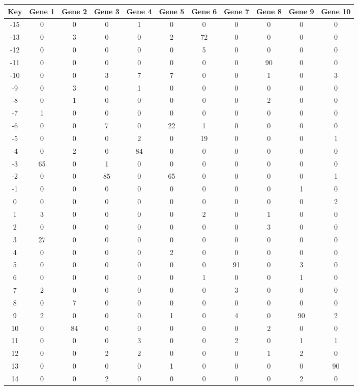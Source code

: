 \begin{tabular}{|c|c|c|c|c|c|c|c|c|c|c|}
\hline
Key & Gene 1 & Gene 2 & Gene 3 & Gene 4 & Gene 5 & Gene 6 & Gene 7 & Gene 8 & Gene 9 & Gene 10 \\
\hline
-15 & 0 & 0 & 0 & 1 & 0 & 0 & 0 & 0 & 0 & 0 \\
-13 & 0 & 3 & 0 & 0 & 2 & 72 & 0 & 0 & 0 & 0 \\
-12 & 0 & 0 & 0 & 0 & 0 & 5 & 0 & 0 & 0 & 0 \\
-11 & 0 & 0 & 0 & 0 & 0 & 0 & 0 & 90 & 0 & 0 \\
-10 & 0 & 0 & 3 & 7 & 7 & 0 & 0 & 1 & 0 & 3 \\
-9 & 0 & 3 & 0 & 1 & 0 & 0 & 0 & 0 & 0 & 0 \\
-8 & 0 & 1 & 0 & 0 & 0 & 0 & 0 & 2 & 0 & 0 \\
-7 & 1 & 0 & 0 & 0 & 0 & 0 & 0 & 0 & 0 & 0 \\
-6 & 0 & 0 & 7 & 0 & 22 & 1 & 0 & 0 & 0 & 0 \\
-5 & 0 & 0 & 0 & 2 & 0 & 19 & 0 & 0 & 0 & 1 \\
-4 & 0 & 2 & 0 & 84 & 0 & 0 & 0 & 0 & 0 & 0 \\
-3 & 65 & 0 & 1 & 0 & 0 & 0 & 0 & 0 & 0 & 0 \\
-2 & 0 & 0 & 85 & 0 & 65 & 0 & 0 & 0 & 0 & 1 \\
-1 & 0 & 0 & 0 & 0 & 0 & 0 & 0 & 0 & 1 & 0 \\
0 & 0 & 0 & 0 & 0 & 0 & 0 & 0 & 0 & 0 & 2 \\
1 & 3 & 0 & 0 & 0 & 0 & 2 & 0 & 1 & 0 & 0 \\
2 & 0 & 0 & 0 & 0 & 0 & 0 & 0 & 3 & 0 & 0 \\
3 & 27 & 0 & 0 & 0 & 0 & 0 & 0 & 0 & 0 & 0 \\
4 & 0 & 0 & 0 & 0 & 2 & 0 & 0 & 0 & 0 & 0 \\
5 & 0 & 0 & 0 & 0 & 0 & 0 & 91 & 0 & 3 & 0 \\
6 & 0 & 0 & 0 & 0 & 0 & 1 & 0 & 0 & 1 & 0 \\
7 & 2 & 0 & 0 & 0 & 0 & 0 & 3 & 0 & 0 & 0 \\
8 & 0 & 7 & 0 & 0 & 0 & 0 & 0 & 0 & 0 & 0 \\
9 & 2 & 0 & 0 & 0 & 1 & 0 & 4 & 0 & 90 & 2 \\
10 & 0 & 84 & 0 & 0 & 0 & 0 & 0 & 2 & 0 & 0 \\
11 & 0 & 0 & 0 & 3 & 0 & 0 & 2 & 0 & 1 & 1 \\
12 & 0 & 0 & 2 & 2 & 0 & 0 & 0 & 1 & 2 & 0 \\
13 & 0 & 0 & 0 & 0 & 1 & 0 & 0 & 0 & 0 & 90 \\
14 & 0 & 0 & 2 & 0 & 0 & 0 & 0 & 0 & 2 & 0 \\
\hline
\end{tabular}